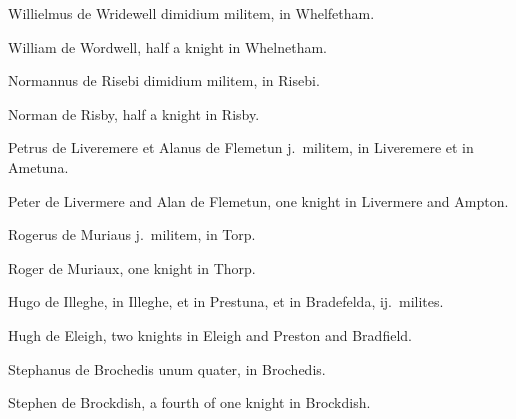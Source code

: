 \documentclass[10pt]{book}
\begin{document}
\begin{paracol}{2}
\switchcolumn*

\begin{otherlanguage}{latin}
Willielmus de Wridewell dimidium militem, in Whelfetham.
\end{otherlanguage}

\switchcolumn

William de Wordwell, half a knight in Whelnetham.

\switchcolumn*

\begin{otherlanguage}{latin}
Normannus de Risebi dimidium militem, in Risebi.
\end{otherlanguage}

\switchcolumn

Norman de Risby, half a knight in Risby.

\switchcolumn*

\begin{otherlanguage}{latin}
Petrus de Liveremere et Alanus de Flemetun j.\ militem, in Liveremere et in Ametuna.
\end{otherlanguage}

\switchcolumn

Peter de Livermere and Alan de Flemetun, one knight in Livermere and Ampton.

\switchcolumn*

\begin{otherlanguage}{latin}
Rogerus de Muriaus j.\ militem, in Torp.
\end{otherlanguage}

\switchcolumn

Roger de Muriaux, one knight in Thorp.

\switchcolumn*

\begin{otherlanguage}{latin}
Hugo de Illeghe, in Illeghe, et in Prestuna, et in Bradefelda, ij.\ milites.
\end{otherlanguage}

\switchcolumn

Hugh de Eleigh, two knights in Eleigh and Preston and Bradfield.

\switchcolumn*

\begin{otherlanguage}{latin}
Stephanus de Brochedis unum quater, in Brochedis.
\end{otherlanguage}

\switchcolumn

Stephen de Brockdish, a fourth of one knight in Brockdish.


\end{paracol}
\end{document}
